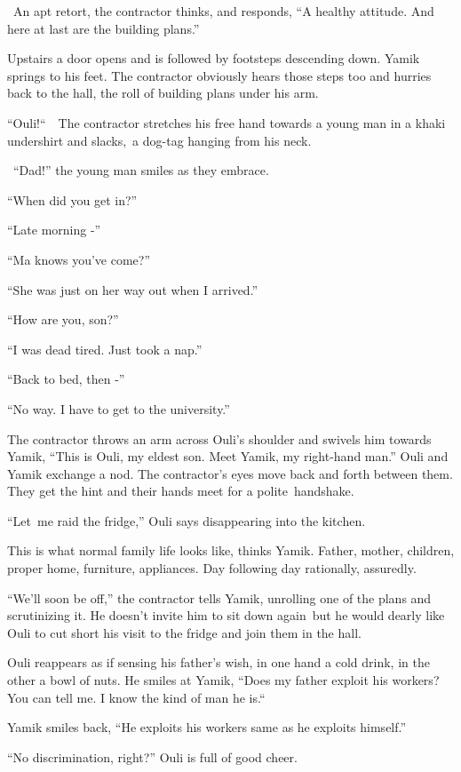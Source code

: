 \documentclass[twoside,11pt]{book}
\begin{document}
~An apt retort, the contractor thinks, and responds, ``A healthy attitude. And here at last are the
building plans.''

Upstairs a door opens and is followed by footsteps descending down. Yamik springs to his feet. The contractor obviously
hears those steps too and hurries back to the hall, the roll of building plans under his arm. 

``Ouli!``\ \ The contractor stretches his free hand towards a young man in a khaki undershirt
and slacks,{\ }a dog-tag hanging from his neck.\ 

~``Dad!'' the young man smiles as they embrace. 

``When did you get in?'' 

``Late morning -'' 

``Ma knows you've come?'' 

``She was just on her way out when I arrived.'' 

``How are you, son?'' 

``I was dead tired. Just took a nap.'' 

``Back to bed, then -'' 

``No way. I have to get to the university.'' 

The contractor throws an arm across Ouli's shoulder and swivels him towards Yamik, ``This is Ouli, my
eldest son. Meet Yamik, my right{}-hand man.'' Ouli and Yamik exchange a nod. The contractor's eyes move
back and forth between them. They get the hint and their hands meet for a polite~handshake. 

``Let~me raid the fridge,'' Ouli says disappearing into the kitchen. 

This is what normal family life looks like, thinks Yamik. Father, mother, children, proper home, furniture, appliances.
Day following day rationally, assuredly.

``We'll soon be off,'' the contractor tells Yamik, unrolling one of the plans and scrutinizing
it. He doesn't invite him to sit down again\ but he would dearly like Ouli to cut short his visit to the fridge and
join them in the hall.

Ouli reappears as if sensing his father's wish, in one hand a cold drink, in the other a bowl of nuts. He smiles at
Yamik, ``Does my father exploit his workers? You can tell me. I know the kind of man he
is.``\ 

Yamik smiles back, ``He exploits his workers same as he exploits himself.'' 

``No discrimination, right?'' Ouli is full of good cheer.
\end{document}
